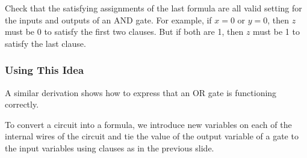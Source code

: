 Check that the satisfying assignments of the last formula are all valid setting for the inputs and outputs of an AND gate. For example, if $x=0$ or $y=0$, then $z$ must be 0 to satisfy the first two clauses. But if both are 1, then $z$ must be 1 to satisfy the last clause.
\subsubsection{Using This Idea}
A similar derivation shows how to express that an OR gate is functioning correctly.

To convert a circuit into a formula, we introduce new variables on each of the internal wires of the circuit and tie the value of the output variable of a gate to the input variables using clauses as in the previous slide.



























